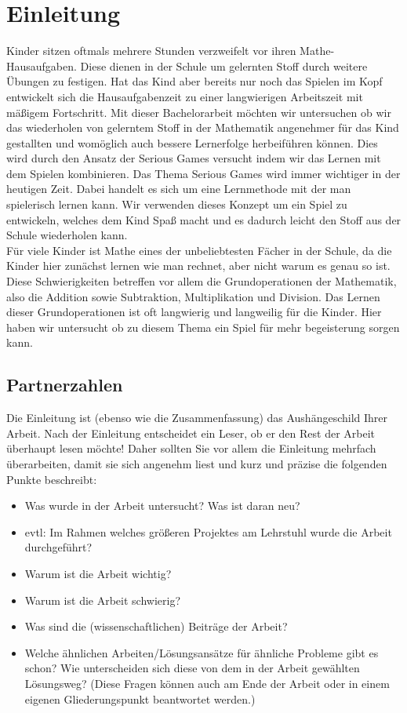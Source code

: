 
\chapter{Einleitung}
Kinder sitzen oftmals mehrere Stunden verzweifelt vor ihren Mathe-Hausaufgaben. Diese dienen in der Schule um gelernten Stoff durch weitere Übungen zu festigen. Hat das Kind aber bereits nur noch das Spielen im Kopf entwickelt sich die Hausaufgabenzeit zu einer langwierigen Arbeitszeit mit mäßigem Fortschritt. Mit dieser Bachelorarbeit möchten wir untersuchen ob wir das wiederholen von gelerntem Stoff in der Mathematik angenehmer für das Kind gestallten und womöglich auch bessere Lernerfolge herbeiführen können. Dies wird durch den Ansatz der Serious Games versucht indem wir das Lernen mit dem Spielen kombinieren. Das Thema Serious Games wird immer wichtiger in der heutigen Zeit. Dabei handelt es sich um eine Lernmethode mit der man spielerisch lernen kann. Wir verwenden dieses Konzept um ein Spiel zu entwickeln, welches dem Kind Spaß macht und es dadurch leicht den Stoff aus der Schule wiederholen kann.
\\
Für viele Kinder ist Mathe eines der unbeliebtesten Fächer in der Schule, da die Kinder hier zunächst lernen wie man rechnet, aber nicht warum es genau so ist. Diese Schwierigkeiten betreffen vor allem die Grundoperationen der Mathematik, also die Addition sowie Subtraktion, Multiplikation und Division. Das Lernen dieser Grundoperationen ist oft langwierig und langweilig für die Kinder. Hier haben wir untersucht ob zu diesem Thema ein Spiel für mehr begeisterung sorgen kann. 

\section{Partnerzahlen}


Die Einleitung ist (ebenso wie die Zusammenfassung) das Aushängeschild Ihrer Arbeit. Nach der Einleitung entscheidet ein Leser, ob er den Rest der Arbeit überhaupt lesen möchte! Daher sollten Sie vor allem die Einleitung mehrfach überarbeiten, damit sie sich angenehm liest und kurz und präzise die folgenden Punkte beschreibt:
\begin{itemize}
  \item Was wurde in der Arbeit untersucht? Was ist daran neu?
  \item evtl: Im Rahmen welches größeren Projektes am Lehrstuhl wurde die Arbeit durchgeführt?
  \item Warum ist die Arbeit wichtig?
  \item Warum ist die Arbeit schwierig?
  \item Was sind die (wissenschaftlichen) Beiträge der Arbeit?
  \item Welche ähnlichen Arbeiten/Lösungsansätze für ähnliche Probleme gibt es schon? Wie unterscheiden sich diese von dem in der Arbeit gewählten Lösungsweg? (Diese Fragen können auch am Ende der Arbeit oder in einem eigenen Gliederungspunkt beantwortet werden.)
\end{itemize}

